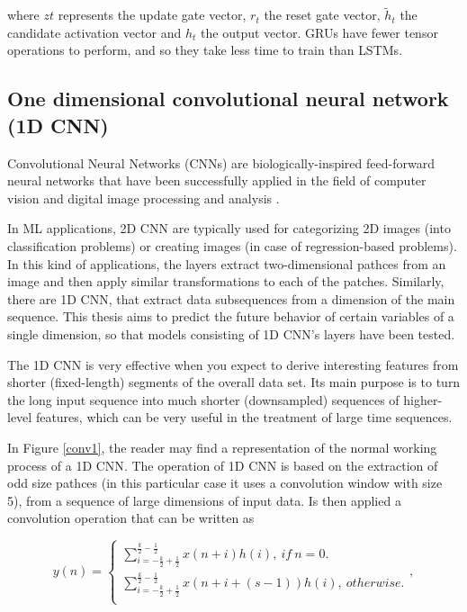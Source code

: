 where $zt$ represents the update gate vector, $r_t$ the reset gate vector, $\tilde{h}_t$ the candidate activation vector and $h_t$ the output vector. \ac{GRU}s have fewer tensor operations to perform, and so they take less time to train than \ac{LSTM}s.  



\subsection{One dimensional convolutional neural network (1D CNN)}\label{sec:1dcnn}


Convolutional Neural Networks (\ac{CNN}s) are biologically-inspired feed-forward neural networks that have been successfully applied in the field of computer vision and digital image processing and analysis \cite{cnn0}.

In \ac{ML} applications, \ac{2D CNN} are typically used for categorizing 2D images (into classification problems) or creating images (in case of regression-based problems). In this kind of applications, the layers extract two-dimensional pathces from an image and then apply similar transformations to each of the patches. Similarly, there are \ac{1D CNN}, that extract data subsequences from a dimension of the main sequence. This thesis aims to predict the future behavior of certain variables of a single dimension, so that models consisting of \ac{1D CNN}'s layers have been tested.

The \ac{1D CNN} is very effective when you expect to derive interesting features from shorter (fixed-length) segments of the overall data set. Its main purpose is to turn the long input sequence into much shorter (downsampled) sequences of higher-level features, which can be very useful in the treatment of large time sequences.

In Figure \ref{conv1}, the reader may find a representation of the normal working process of a \ac{1D CNN}. The operation of \ac{1D CNN} is based on the extraction of odd size pathces (in this particular case it uses a convolution window with size 5), from a sequence of large dimensions of input data. Is then applied a convolution operation that can be written as \cite{cnn2} 

\begin{equation}
y(n)=
    \begin{cases} 
            
        \sum_{i=-\frac{k}{2}+\frac{1}{2}}^{\frac{k}{2}-\frac{1}{2}} x(n+i)h(i),\  if \  n=0.\\
        \sum_{i=-\frac{k}{2}+\frac{1}{2}}^{\frac{k}{2}-\frac{1}{2}} x(n+i+(s-1))h(i),\  otherwise.\\
    
    \end{cases} ,
\end{equation}

